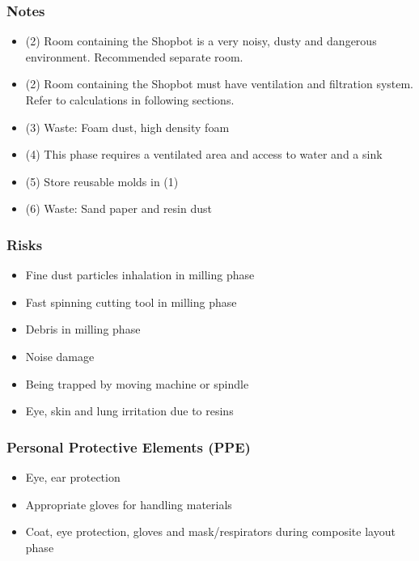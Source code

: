 \documentclass[a4paper,12pt,titlepage]{article}
\begin{document}
\subsubsection*{Notes}
\begin{itemize}
\item (2) Room containing the Shopbot is a very noisy, dusty and dangerous environment. Recommended separate room.
\item (2) Room containing the Shopbot must have ventilation and filtration system. Refer to calculations in following sections.
\item (3) Waste: Foam dust, high density foam
\item (4) This phase requires a ventilated area and access to water and a sink
\item (5) Store reusable molds in (1)
\item (6) Waste: Sand paper and resin dust
\end{itemize}
\subsubsection*{Risks}
\begin{itemize}
\item Fine dust particles inhalation in milling phase
\item Fast spinning cutting tool in milling phase
\item Debris in milling phase
\item Noise damage
\item Being trapped by moving machine or spindle
\item Eye, skin and lung irritation due to resins
\end{itemize}
\subsubsection*{Personal Protective Elements (PPE)}
\begin{itemize}
\item Eye, ear protection
\item Appropriate gloves for handling materials
\item Coat, eye protection, gloves and mask/respirators during composite layout phase
\end{itemize}
\clearpage
\end{document}
